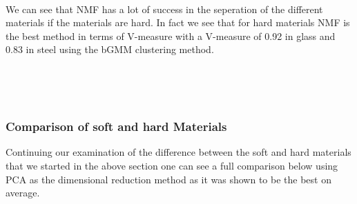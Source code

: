 \documentclass[11pt]{article}
\begin{document}
    \begin{center}
    \end{center}
    { \hspace*{\fill} \\}
    


    We can see that NMF has a lot of success in the seperation of the
different materials if the materials are hard. In fact we see that for
hard materials NMF is the best method in terms of V-measure with a
V-measure of 0.92 in glass and 0.83 in steel using the bGMM clustering
method.



    \begin{center}
    \end{center}
    { \hspace*{\fill} \\}
    
    \begin{center}
    \end{center}
    { \hspace*{\fill} \\}
    
    \hypertarget{comparison-of-soft-and-hard-materials}{%
\subsubsection{Comparison of soft and hard
Materials}\label{comparison-of-soft-and-hard-materials}}



    Continuing our examination of the difference between the soft and hard
materials that we started in the above section one can see a full
comparison below using PCA as the dimensional reduction method as it was
shown to be the best on average.



    \begin{center}
    \end{center}
    { \hspace*{\fill} \\}
    
\end{document}
